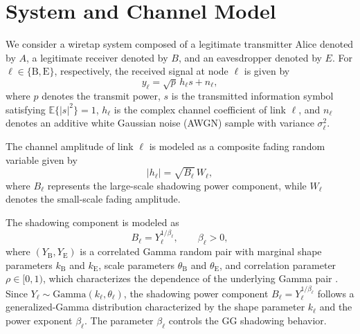 \documentclass[lettersize,journal]{IEEEtran}
\begin{document}
\section{System and Channel Model}
\label{sec:sysmo}

We consider a wiretap system composed of a legitimate transmitter Alice denoted by \(A\), a legitimate receiver denoted by \(B\), and an eavesdropper denoted by \(E\). For \(\ell\in\{\mathrm B,\mathrm E\}\), respectively, the received signal at node \(\ell\) is given by \cite{8060499}
\begin{equation}
    y_\ell=\sqrt{p}\,h_\ell s+n_\ell,
    \label{eq:received_signals}
\end{equation}
where \(p\) denotes the transmit power, \(s\) is the transmitted information symbol satisfying \(\mathbb{E}\{|s|^2\}=1\), \(h_\ell\) is the complex channel coefficient of link \(\ell\), and \(n_\ell\) denotes an additive white Gaussian noise (AWGN) sample with variance \(\sigma_\ell^2\).

The channel amplitude of link \(\ell\) is modeled as a composite fading random variable given by
\begin{equation}
    |h_\ell|=\sqrt{B_\ell}\,W_\ell,
    \label{eq:channel_amplitudes}
\end{equation}
where \(B_\ell\) represents the large-scale shadowing power component, while \(W_\ell\) denotes the small-scale fading amplitude.

The shadowing component is modeled as
\begin{equation}
    B_\ell = Y_\ell^{1/\beta_\ell}, \qquad \beta_\ell>0,
    \label{eq:shadowing_model}
\end{equation}
where \((Y_{\mathrm B},Y_{\mathrm E})\) is a correlated Gamma random pair with marginal shape parameters \(k_{\mathrm B}\) and \(k_{\mathrm E}\), scale parameters \(\theta_{\mathrm B}\) and \(\theta_{\mathrm E}\), and correlation parameter \(\rho\in[0,1)\), which characterizes the dependence of the underlying Gamma pair \cite{5281755}. Since \(Y_\ell\sim\mathrm{Gamma}(k_\ell,\theta_\ell)\), the shadowing power component \(B_\ell=Y_\ell^{1/\beta_\ell}\) follows a generalized-Gamma distribution characterized by the shape parameter \(k_\ell\) and the power exponent \(\beta_\ell\). The parameter \(\beta_\ell\) controls the GG shadowing behavior.
\end{document}
